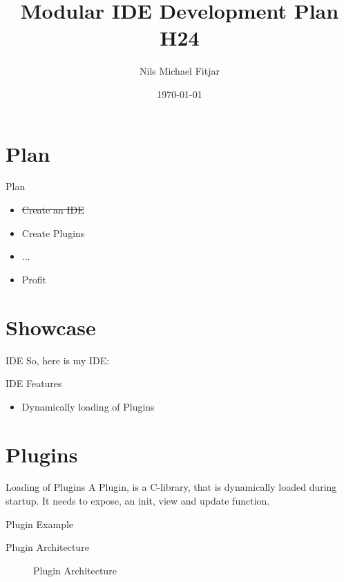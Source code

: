 \documentclass[UKenglish]{beamer}
\title{Modular IDE Development Plan H24}
\author{Nils Michael Fitjar}
\date{\today}
\begin{document}
\frame{\titlepage}

\section{Plan}
\begin{frame}{Plan}
    \begin{itemize}
        \item \sout{Create an IDE}
        \item Create Plugins
        \item ...
        \item Profit
    \end{itemize}
\end{frame}

\section{Showcase}
\begin{frame}{IDE}
  So, here is my IDE:
\end{frame}

\begin{frame}{IDE Features}
  \begin{itemize}
    \item Dynamically loading of Plugins
  \end{itemize}
\end{frame}

\section{Plugins}
\begin{frame}{Loading of Plugins}
  A Plugin, is a C-library, that is dynamically loaded
  during startup.
  It needs to expose, an init, view and update function.
\end{frame}

\begin{frame}{Plugin Example}
  
\end{frame}

\begin{frame}{Plugin Architecture}
    \begin{figure}
        \centering
        
        \caption{Plugin Architecture}
    \end{figure}
\end{frame}
\end{document}

